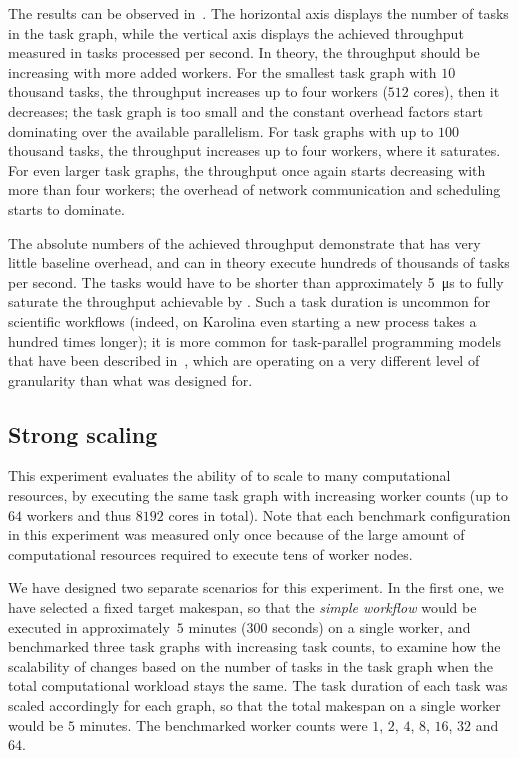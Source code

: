 The results can be observed in~. The horizontal axis displays the number of
tasks in the task graph, while the vertical axis displays the achieved throughput measured in tasks
processed per second. In theory, the throughput should be increasing with more added workers. For
the smallest task graph with $10$ thousand tasks, the throughput increases up to
four workers ($512$ cores), then it decreases; the task graph is too small and the
constant overhead factors start dominating over the available parallelism. For task graphs with up
to $100$ thousand tasks, the throughput increases up to four workers, where it
saturates. For even larger task graphs, the throughput once again starts decreasing with more than
four workers; the overhead of network communication and scheduling starts to dominate.

The absolute numbers of the achieved throughput demonstrate that \hyperqueue{} has very
little baseline overhead, and can in theory execute hundreds of thousands of tasks per second. The
tasks would have to be shorter than approximately \SI{5}{\micro\second} to fully saturate the
throughput achievable by \hyperqueue{}. Such a task duration is uncommon for scientific
workflows (indeed, on Karolina even starting a new process takes a hundred times longer); it is
more common for task-parallel programming models that have been described
in~, which are operating on a very different level of granularity than what
\hyperqueue{} was designed for.

\subsection{Strong scaling}
\label{sec:hq-exp-scalability}
This experiment evaluates the ability of \hyperqueue{} to scale to many computational
resources, by executing the same task graph with increasing worker counts (up to
$64$ workers and thus $8192$ cores in total). Note that each
benchmark configuration in this experiment was measured only once because of the large amount of
computational resources required to execute tens of worker nodes.

We have designed two separate scenarios for this experiment. In the first one, we have selected a
fixed target makespan, so that the \emph{simple workflow} would be executed in approximately\
$5$ minutes ($300$ seconds) on a single worker, and benchmarked
three task graphs with increasing task counts, to examine how the scalability of
\hyperqueue{} changes based on the number of tasks in the task graph when the total
computational workload stays the same. The task duration of each task was scaled accordingly for
each graph, so that the total makespan on a single worker would be $5$ minutes.
The benchmarked worker counts were $1$, $2$,
$4$, $8$, $16$, $32$ and
$64$.

